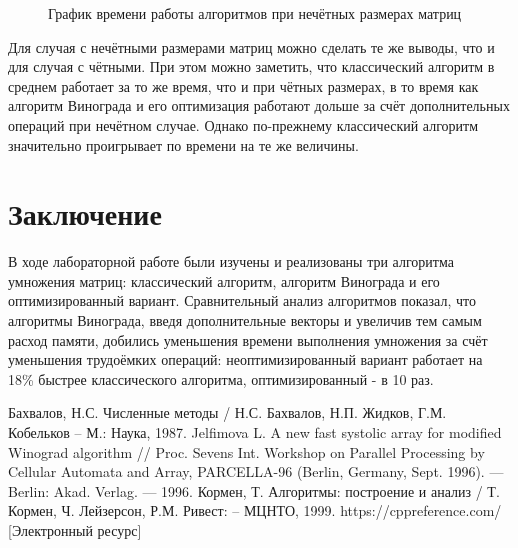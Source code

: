 \documentclass[12pt, a4paper]{report}
\begin{document}
	\begin{figure}[ht!]
		\caption{График времени работы алгоритмов при нечётных размерах матриц}
		\label{graph-odd}
	\end{figure}

	\newpage
	
 	Для случая с нечётными размерами матриц можно сделать те же выводы, что и для случая с чётными. При этом можно заметить, что классический алгоритм в среднем работает за то же время, что и при чётных размерах, в то время как алгоритм Винограда и его оптимизация работают дольше за счёт дополнительных операций при нечётном случае. Однако по-прежнему классический алгоритм значительно проигрывает по времени на те же величины.

	\chapter*{Заключение}
	В ходе лабораторной работе были изучены и реализованы три алгоритма умножения матриц: классический алгоритм, алгоритм Винограда и его оптимизированный вариант. Сравнительный анализ алгоритмов показал, что алгоритмы Винограда, введя дополнительные векторы и увеличив тем самым расход памяти, добились уменьшения времени выполнения умножения за счёт уменьшения трудоёмких операций: неоптимизированный вариант работает на 18\% быстрее классического алгоритма, оптимизированный - в 10 раз.
	
	\newpage
	
	\begin{thebibliography}{}
	 Бахвалов, Н.С. Численные методы / Н.С. Бахвалов, Н.П. Жидков, Г.М. Кобельков – М.: Наука, 1987.
	 Jelfimova L. A new fast systolic array for modified Winograd algorithm // Proc. Sevens Int. Workshop on Parallel Processing by Cellular Automata and Array, PARCELLA-96 (Berlin, Germany, Sept. 1996). — Berlin: Akad. Verlag. — 1996.
	 Кормен, Т. Алгоритмы: построение и анализ / Т. Кормен, Ч. Лейзерсон, Р.М. Ривест: – МЦНТО, 1999.
	 https://cppreference.com/ [Электронный ресурс]
	\end{thebibliography}
\end{document}
